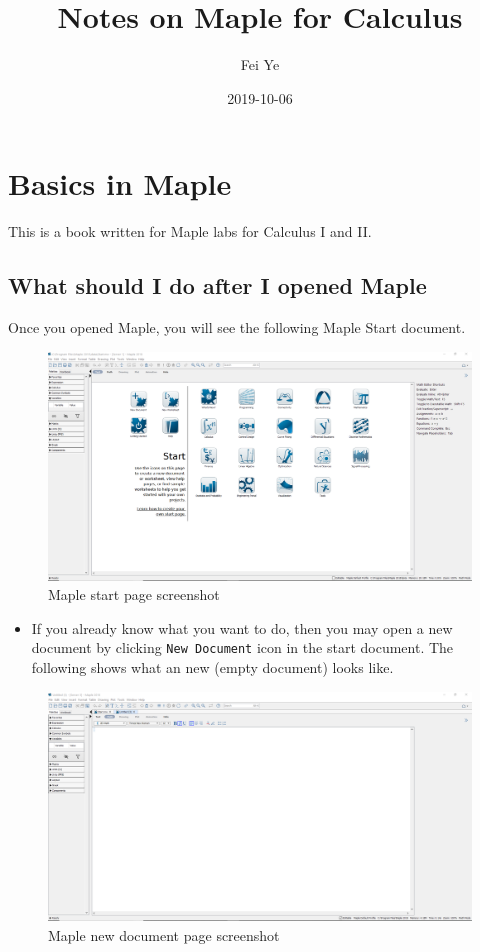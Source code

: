 \documentclass[]{book}
\title{Notes on Maple for Calculus}
\author{Fei Ye}
\date{2019-10-06}
\providecommand{\tightlist}{%
  \setlength{\itemsep}{0pt}\setlength{\parskip}{0pt}}
\theoremstyle{definition}
\theoremstyle{definition}
\theoremstyle{definition}
\theoremstyle{remark}
\begin{document}
\maketitle

{
\setcounter{tocdepth}{1}
\tableofcontents
}
\hypertarget{basics-in-maple}{%
\chapter{Basics in Maple}\label{basics-in-maple}}

This is a book written for Maple labs for Calculus I and II.

\hypertarget{what-should-i-do-after-i-opened-maple}{%
\section{What should I do after I opened Maple}\label{what-should-i-do-after-i-opened-maple}}

Once you opened Maple, you will see the following Maple Start document.

\begin{figure}
\centering
\includegraphics{figs/Maple-Start.png}
\caption{Maple start page screenshot}
\end{figure}

\begin{itemize}
\tightlist
\item
  If you already know what you want to do, then you may open a new document by clicking \texttt{New\ Document} icon in the start document. The following shows what an new (empty document) looks like.
\end{itemize}

\begin{figure}
\centering
\includegraphics{figs/Maple-New-Doc.png}
\caption{Maple new document page screenshot}
\end{figure}
\end{document}
